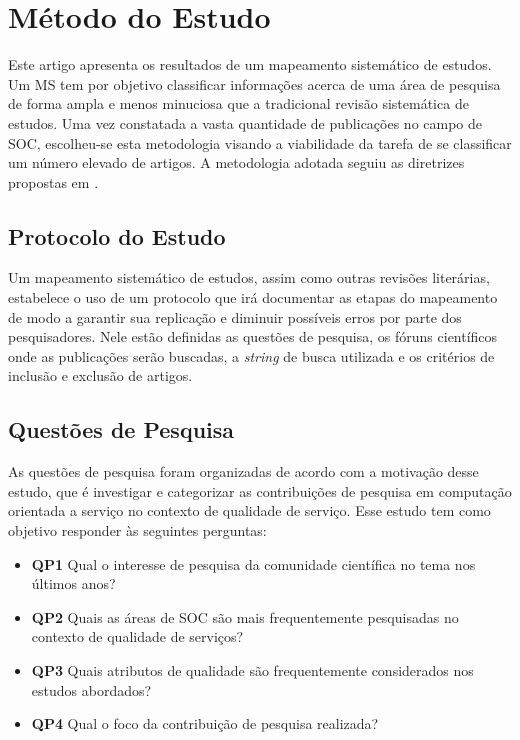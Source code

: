 
\section{Método do Estudo}\label{sec:review_method}

Este artigo apresenta os resultados de um mapeamento sistemático de estudos. Um MS tem por objetivo classificar informações acerca de uma área de pesquisa de forma ampla e menos minuciosa que a tradicional revisão sistemática de estudos. Uma vez constatada a vasta quantidade de publicações no campo de SOC, escolheu-se esta metodologia visando a viabilidade da tarefa de se classificar um número elevado de artigos. A metodologia adotada seguiu as diretrizes propostas em \cite{Petersen:2008:SMS:2227115.2227123}.

\subsection{Protocolo do Estudo}

Um mapeamento sistemático de estudos, assim como outras revisões literárias, estabelece o uso de um protocolo que irá documentar as etapas do mapeamento de modo a garantir sua replicação e diminuir possíveis erros por parte dos pesquisadores. Nele estão definidas as questões de pesquisa, os fóruns científicos onde as publicações serão buscadas, a \textit{string} de busca utilizada e os critérios de inclusão e exclusão de artigos. 

\subsection{Quest\~{o}es de Pesquisa}

As questões de pesquisa foram organizadas de acordo com a motivação desse estudo, que é investigar e categorizar as contribuições de pesquisa em computação orientada a serviço no contexto de qualidade de serviço. Esse estudo tem como objetivo responder às seguintes perguntas: 

\begin{itemize}
\item {\bf QP1} Qual o interesse de pesquisa da comunidade científica no tema nos \'{u}ltimos anos? 
\item {\bf QP2} Quais as áreas de SOC são mais frequentemente pesquisadas no contexto de qualidade de serviços?
\item {\bf QP3} Quais atributos de qualidade são frequentemente considerados nos estudos abordados?
\item {\bf QP4} Qual o foco da contribuição de pesquisa realizada?   
\end{itemize}

